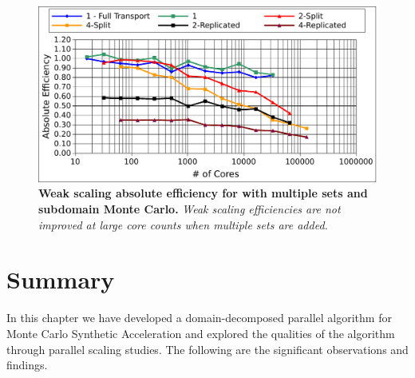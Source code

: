 \begin{figure}[t!]
  \begin{center}
    \includegraphics[width=6in]{chapters/parallel_mc/titan_weak_subdomain_ms.pdf}
  \end{center}
  \caption{\textbf{Weak scaling absolute efficiency for with multiple
      sets and subdomain Monte Carlo.} \textit{Weak scaling
      efficiencies are not improved at large core counts when multiple
      sets are added.}}
  \label{fig:titan_weak_subdomain_ms}
\end{figure}

\clearpage

\section{Summary\ }
\label{sec:parallel_summary}

In this chapter we have developed a domain-decomposed parallel
algorithm for Monte Carlo Synthetic Acceleration and explored the
qualities of the algorithm through parallel scaling studies. The
following are the significant observations and findings.

